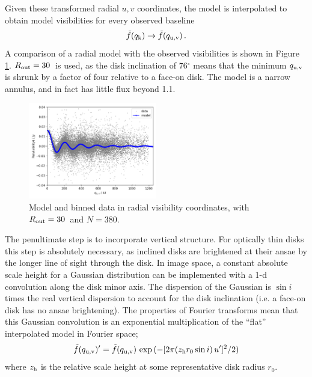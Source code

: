 \documentclass[fleqn,usenatbib]{mnras}
\begin{document}
Given these transformed radial $u,v$ coordinates, the model is interpolated to obtain model visibilities for every observed baseline
\begin{equation}
    \Tilde{f}(q_{\rm k}) \rightarrow \Tilde{f}(q_{\rm u,v}) \, .
\end{equation}
A comparison of a radial model with the observed visibilities is shown in Figure \ref{fig:model}. $R_{\rm out}=30$\arcsec~is used, as the disk inclination of 76$^\circ$ means that the minimum $q_{\rm u,v}$ is shrunk by a factor of four relative to a face-on disk. The model is a narrow annulus, and in fact has little flux beyond 1.1\arcsec.

\begin{figure}
    \centering
    \hspace{-0.5cm}\includegraphics[width=0.5\textwidth]{model.png}
    \caption{Model and binned data in radial visibility coordinates, with $R_{\rm out} = 30$\arcsec~and $N=380$.}
    \label{fig:model}
\end{figure}

The penultimate step is to incorporate vertical structure. For optically thin disks this step is absolutely necessary, as inclined disks are brightened at their ansae by the longer line of sight through the disk. In image space, a constant absolute scale height for a Gaussian distribution can be implemented with a 1-d convolution along the disk minor axis. The dispersion of the Gaussian is $\sin i$ times the real vertical dispersion to account for the disk inclination (i.e. a face-on disk has no ansae brightening). The properties of Fourier transforms mean that this Gaussian convolution is an exponential multiplication of the ``flat'' interpolated model in Fourier space;
\begin{equation}\label{eq:vert}
    \Tilde{f}(q_{\rm u,v})' = \Tilde{f}(q_{\rm u,v}) \, \exp{(-[2 \pi (z_{\rm h} r_0 \sin i) \, u']^2/2)}
\end{equation}
where $z_{\rm h}$ is the relative scale height at some representative disk radius $r_0$.
\end{document}
